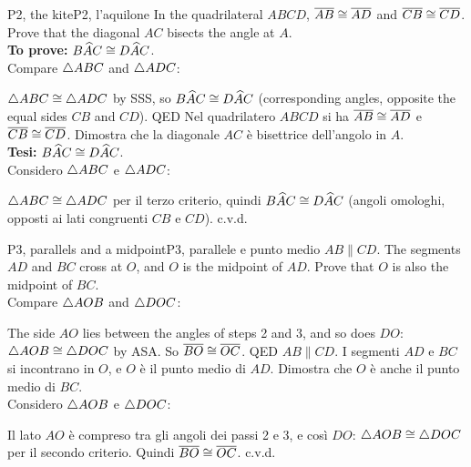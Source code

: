 \begin{proofbox}{P2, the kite}{P2, l'aquilone}
In the quadrilateral $ABCD$, $\overline{AB} \cong \overline{AD}$ and $\overline{CB} \cong \overline{CD}$. Prove that the diagonal $AC$ bisects the angle at $A$.\\
\textbf{To prove:} $B\widehat{A}C \cong D\widehat{A}C$.\\
Compare $\triangle ABC$ and $\triangle ADC$:
\begin{steps}
\end{steps}
$\triangle ABC \cong \triangle ADC$ by SSS, so $B\widehat{A}C \cong D\widehat{A}C$ (corresponding angles, opposite the equal sides $CB$ and $CD$). \hfill QED
\tcblower
Nel quadrilatero $ABCD$ si ha $\overline{AB} \cong \overline{AD}$ e $\overline{CB} \cong \overline{CD}$. Dimostra che la diagonale $AC$ è bisettrice dell'angolo in $A$.\\
\textbf{Tesi:} $B\widehat{A}C \cong D\widehat{A}C$.\\
Considero $\triangle ABC$ e $\triangle ADC$:
\begin{steps}
\end{steps}
$\triangle ABC \cong \triangle ADC$ per il terzo criterio, quindi $B\widehat{A}C \cong D\widehat{A}C$ (angoli omologhi, opposti ai lati congruenti $CB$ e $CD$). \hfill c.v.d.
\end{proofbox}

\begin{proofbox}{P3, parallels and a midpoint}{P3, parallele e punto medio}
$AB \parallel CD$. The segments $AD$ and $BC$ cross at $O$, and $O$ is the midpoint of $AD$. Prove that $O$ is also the midpoint of $BC$.\\
Compare $\triangle AOB$ and $\triangle DOC$:
\begin{steps}
\end{steps}
The side $AO$ lies between the angles of steps 2 and 3, and so does $DO$: $\triangle AOB \cong \triangle DOC$ by ASA. So $\overline{BO} \cong \overline{OC}$. \hfill QED
\tcblower
$AB \parallel CD$. I segmenti $AD$ e $BC$ si incontrano in $O$, e $O$ è il punto medio di $AD$. Dimostra che $O$ è anche il punto medio di $BC$.\\
Considero $\triangle AOB$ e $\triangle DOC$:
\begin{steps}
\end{steps}
Il lato $AO$ è compreso tra gli angoli dei passi 2 e 3, e così $DO$: $\triangle AOB \cong \triangle DOC$ per il secondo criterio. Quindi $\overline{BO} \cong \overline{OC}$. \hfill c.v.d.
\end{proofbox}

